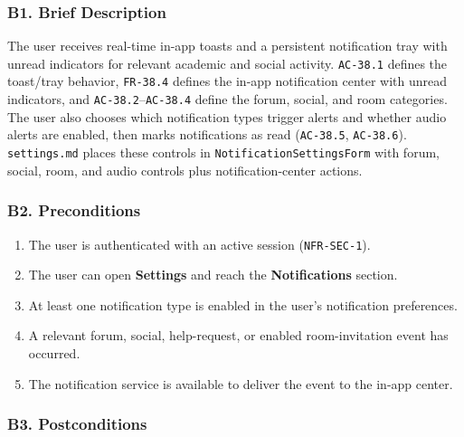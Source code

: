 \documentclass[12pt]{article}
\begin{document}
\hypertarget{sec:b1-brief-description}{}
\subsubsection*{B1. Brief Description}
\par\medskip

The user receives real-time in-app toasts and a persistent notification tray with unread indicators for relevant academic and social activity. \texttt{AC-38.1} defines the toast/tray behavior, \texttt{FR-38.4} defines the in-app notification center with unread indicators, and \texttt{AC-38.2}--\texttt{AC-38.4} define the forum, social, and room categories. The user also chooses which notification types trigger alerts and whether audio alerts are enabled, then marks notifications as read (\texttt{AC-38.5}, \texttt{AC-38.6}). \texttt{settings.md} places these controls in \texttt{NotificationSettingsForm} with forum, social, room, and audio controls plus notification-center actions.
\par\medskip

\hypertarget{sec:b2-preconditions}{}
\subsubsection*{B2. Preconditions}
\par\medskip

\begin{enumerate}
\item The user is authenticated with an active session (\texttt{NFR-SEC-1}).
\item The user can open \textbf{Settings} and reach the \textbf{Notifications} section.
\item At least one notification type is enabled in the user's notification preferences.
\item A relevant forum, social, help-request, or enabled room-invitation event has occurred.
\item The notification service is available to deliver the event to the in-app center.
\end{enumerate}
\par\medskip

\hypertarget{sec:b3-postconditions}{}
\subsubsection*{B3. Postconditions}
\par\medskip
\end{document}
